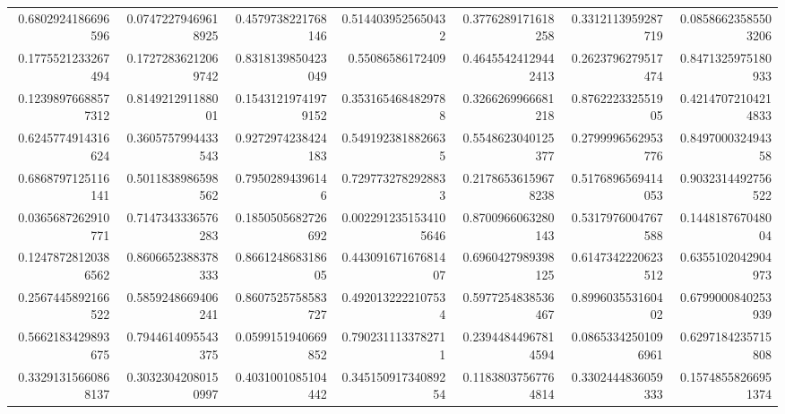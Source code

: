 \documentclass{standalone}
\begin{document}
\begin{tabular}{*{7}{R}}
0.6802924186696596 & 0.07472279469618925 & 0.4579738221768146 & 0.5144039525650432 & 0.3776289171618258 & 0.3312113959287719 & 0.08586623585503206 \\
0.1775521233267494 & 0.17272836212069742 & 0.8318139850423049 & 0.55086586172409 & 0.46455424129442413 & 0.2623796279517474 & 0.8471325975180933 \\
0.12398976688577312 & 0.814921291188001 & 0.15431219741979152 & 0.3531654684829788 & 0.3266269966681218 & 0.876222332551905 & 0.42147072104214833 \\
0.6245774914316624 & 0.3605757994433543 & 0.9272974238424183 & 0.5491923818826635 & 0.5548623040125377 & 0.2799996562953776 & 0.849700032494358 \\
0.6868797125116141 & 0.5011838986598562 & 0.79502894396146 & 0.7297732782928833 & 0.21786536159678238 & 0.5176896569414053 & 0.9032314492756522 \\
0.0365687262910771 & 0.7147343336576283 & 0.1850505682726692 & 0.0022912351534105646 & 0.8700966063280143 & 0.5317976004767588 & 0.144818767048004 \\
0.12478728120386562 & 0.8606652388378333 & 0.866124868318605 & 0.44309167167681407 & 0.6960427989398125 & 0.6147342220623512 & 0.6355102042904973 \\
0.2567445892166522 & 0.5859248669406241 & 0.8607525758583727 & 0.4920132222107534 & 0.5977254838536467 & 0.899603553160402 & 0.6799000840253939 \\
0.5662183429893675 & 0.7944614095543375 & 0.0599151940669852 & 0.7902311133782711 & 0.23944844967814594 & 0.08653342501096961 & 0.6297184235715808 \\
0.33291315660868137 & 0.30323042080150997 & 0.4031001085104442 & 0.34515091734089254 & 0.11838037567764814 & 0.3302444836059333 & 0.15748558266951374
\end{tabular}
\end{document}
